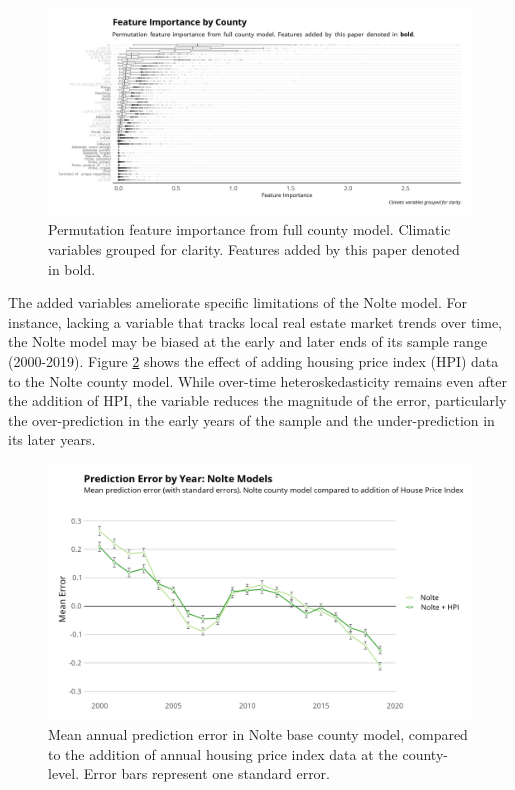 \documentclass[12pt]{article}
\begin{document}
\begin{figure}
    \centering
    \includegraphics[width=1\textwidth]{exhibits/fcb_importance_all.png}
    \caption{Permutation feature importance from full county model. Climatic variables grouped for clarity. Features added by this paper denoted in bold.}
    \label{fig:fcb_importance}
\end{figure}

The added variables ameliorate specific limitations of the Nolte model. For instance, lacking a variable that tracks local real estate market trends over time, the Nolte model may be biased at the early and later ends of its sample range (2000-2019). Figure \ref{fig:nolte_resid_time} shows the effect of adding housing price index (HPI) data to the Nolte county model. While over-time heteroskedasticity remains even after the addition of HPI, the variable reduces the magnitude of the error, particularly the over-prediction in the early years of the sample and the under-prediction in its later years.

\begin{figure}
    \centering
    \includegraphics[width=1\textwidth]{exhibits/nolte_resid_time.png}
    \caption{Mean annual prediction error in Nolte base county model, compared to the addition of annual housing price index data at the county-level. Error bars represent one standard error.}
    \label{fig:nolte_resid_time}
\end{figure}
\end{document}

